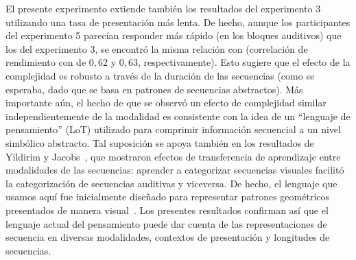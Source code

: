 
El presente experimento extiende también los resultados del experimento 3 utilizando una tasa de presentación más lenta. De hecho, aunque los participantes del experimento 5 parecían responder más rápido (en los bloques auditivos) que los del experimento 3, se encontró la misma relación con \mdlbin (correlación de rendimiento con \mdlbin de $0,62$ y $0,63$, respectivamente). Esto sugiere que el efecto de la complejidad es robusto a través de la duración de las secuencias (como se esperaba, dado que \mdlbin se basa en patrones de secuencias abstractos). Más importante aún, el hecho de que se observó un efecto de complejidad similar independientemente de la modalidad es consistente con la idea de un ``lenguaje de pensamiento'' (LoT) utilizado para comprimir información secuencial a un nivel simbólico abstracto. Tal suposición se apoya también en los resultados de Yildirim y Jacobs~\cite{yildirim2015learning}, que mostraron efectos de transferencia de aprendizaje entre modalidades de las secuencias: aprender a categorizar secuencias visuales facilitó la categorización de secuencias auditivas y viceversa. De hecho, el lenguaje que usamos aquí fue inicialmente diseñado para representar patrones geométricos presentados de manera visual~\cite{amalric2017language}. Los presentes resultados confirman así que el lenguaje actual del pensamiento puede dar cuenta de las representaciones de secuencia en diversas modalidades, contextos de presentación y longitudes de secuencias.


